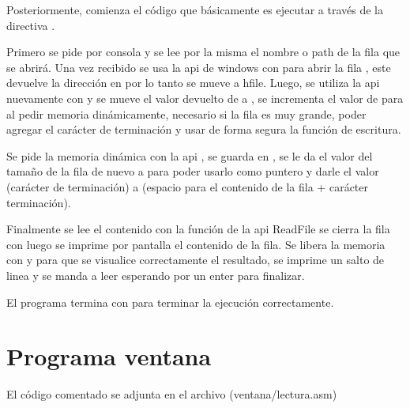 \vspace{0.5cm}

Posteriormente, comienza el código que básicamente es ejecutar 
a través de la directiva .


Primero se pide por consola y se lee por la misma el nombre o path de la fila
que se abrirá. Una vez recibido se usa la api de windows con  para
abrir la fila \Cite{MicrosoftCreateFileA}, este devuelve la dirección en 
por lo tanto se mueve a hfile. Luego, se utiliza la api nuevamente con 
\Cite{Windowsgetsize} y se mueve el valor devuelto de  a
, se incrementa el valor de  para al pedir
memoria dinámicamente, necesario si la fila es muy grande, poder agregar el
carácter de terminación y usar de forma segura la función de escritura.


Se pide la memoria dinámica con la api  \Cite{GlobalAlloc},
se guarda en , se le da el valor del tamaño de la fila de nuevo a
 para poder usarlo como puntero y darle el valor 
(carácter de terminación) a  (espacio para el contenido de la
fila + carácter terminación).


Finalmente se lee el contenido con la función de la api ReadFile
\Cite{MicrosoftReadFile} se cierra la fila con 
\Cite{CloseHandle}
luego se imprime por pantalla el contenido de la fila. Se libera la memoria con
 y para que se visualice correctamente el resultado, se
imprime un salto de linea y se manda a leer esperando por un enter para finalizar.


El programa termina con  para terminar la ejecución
correctamente.





\section{Programa ventana}

El código comentado se adjunta en el archivo (ventana/lectura.asm)
